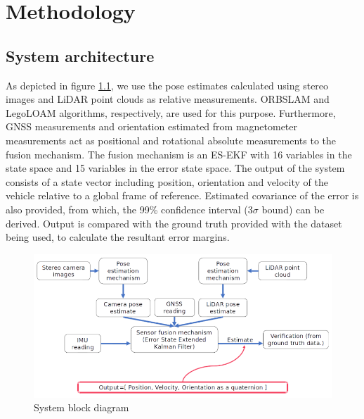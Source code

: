 \chapter{Methodology}





\section{System architecture}
\label{sec:SystemArchitecture}
As depicted in figure \ref{fig:pa:systemBlockDiagram}, we use the pose estimates calculated using stereo images and \gls{LiDAR} point clouds as relative measurements. \gls{ORBSLAM} and LegoLOAM algorithms, respectively, are used for this purpose. Furthermore, \gls{GNSS} measurements and orientation estimated from magnetometer measurements act as positional and rotational absolute measurements to the fusion mechanism. The fusion mechanism is an \gls{ES-EKF} with 16 variables in the state space and 15 variables in the error state space. The output of the system consists of a state vector including position, orientation and velocity of the vehicle relative to a global frame of reference. Estimated covariance of the error is also provided, from which, the 99\% confidence interval ($3\sigma$ bound) can be derived. Output is compared with the ground truth provided with the dataset being used, to calculate the resultant error margins.
\begin{figure}[h]
	\begin{center}
	\includegraphics[width=\textwidth]{figs/system-block-diagram.png}
	\end{center}
	\vspace{-0.5cm}
	\caption{System block diagram}
	\label{fig:pa:systemBlockDiagram}
	\vspace{0.5cm}
\end{figure}

